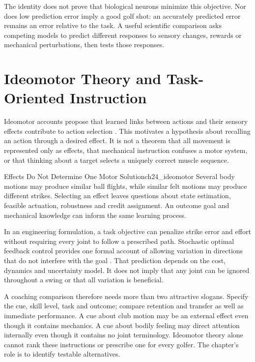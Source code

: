 The identity does not prove that biological neurons minimize this objective. Nor does low prediction error imply a good golf shot: an accurately predicted error remains an error relative to the task. A useful scientific comparison asks competing models to predict different responses to sensory changes, rewards or mechanical perturbations, then tests those responses.

\section{Ideomotor Theory and Task-Oriented Instruction}
\label{sec:ch24_ideomotor}
\label{thm:ch24_ideomotor}
Ideomotor accounts propose that learned links between actions and their sensory effects contribute to action selection \citep{Hommel2001TEC}. This motivates a hypothesis about recalling an action through a desired effect. It is not a theorem that all movement is represented only as effects, that mechanical instruction confuses a motor system, or that thinking about a target selects a uniquely correct muscle sequence.

\begin{principle}{Effects Do Not Determine One Motor Solution}{ch24_ideomotor}
Several body motions may produce similar ball flights, while similar felt motions may produce different strikes. Selecting an effect leaves questions about state estimation, feasible actuation, robustness and credit assignment. An outcome goal and mechanical knowledge can inform the same learning process.
\end{principle}

In an engineering formulation, a task objective can penalize strike error and effort without requiring every joint to follow a prescribed path. Stochastic optimal feedback control provides one formal account of allowing variation in directions that do not interfere with the goal \citep{Todorov2002}. That prediction depends on the cost, dynamics and uncertainty model. It does not imply that any joint can be ignored throughout a swing or that all variation is beneficial.

A coaching comparison therefore needs more than two attractive slogans. Specify the cue, skill level, task and outcome; compare retention and transfer as well as immediate performance. A cue about club motion may be an external effect even though it contains mechanics. A cue about bodily feeling may direct attention internally even though it contains no joint terminology. Ideomotor theory alone cannot rank these instructions or prescribe one for every golfer. The chapter's role is to identify testable alternatives.

